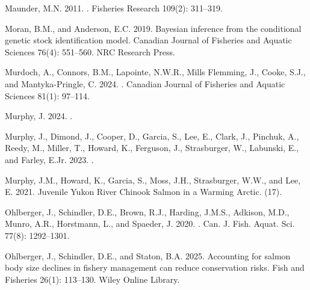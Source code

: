 \documentclass[11pt]{book}
\begin{document}
\begin{CSLReferences}{1}{0}
%
Maunder, M.N. 2011. . Fisheries Research 109(2): 311--319.

%
Moran, B.M., and Anderson, E.C. 2019. Bayesian inference from the conditional genetic stock identification model. Canadian Journal of Fisheries and Aquatic Sciences 76(4): 551--560. NRC Research Press.

%
Murdoch, A., Connors, B.M., Lapointe, N.W.R., Mills Flemming, J., Cooke, S.J., and Mantyka-Pringle, C. 2024. . Canadian Journal of Fisheries and Aquatic Sciences 81(1): 97--114.

%
Murphy, J. 2024. .

%
Murphy, J., Dimond, J., Cooper, D., Garcia, S., Lee, E., Clark, J., Pinchuk, A., Reedy, M., Miller, T., Howard, K., Ferguson, J., Strasburger, W., Labunski, E., and Farley, E.Jr. 2023. .

%
Murphy, J.M., Howard, K., Garcia, S., Moss, J.H., Strasburger, W.W., and Lee, E. 2021. Juvenile Yukon River Chinook Salmon in a Warming Arctic. (17).

%
Ohlberger, J., Schindler, D.E., Brown, R.J., Harding, J.M.S., Adkison, M.D., Munro, A.R., Horstmann, L., and Spaeder, J. 2020. . Can. J. Fish. Aquat. Sci. 77(8): 1292--1301.

%
Ohlberger, J., Schindler, D.E., and Staton, B.A. 2025. Accounting for salmon body size declines in fishery management can reduce conservation risks. Fish and Fisheries 26(1): 113--130. Wiley Online Library.


\end{CSLReferences}
\end{document}
